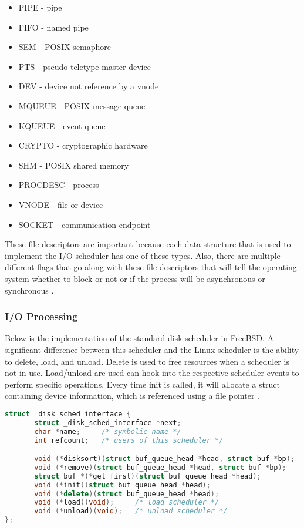 \documentclass[letterpaper,draftclsnofoot,10pt,onecolumn,titlepage]{IEEEtran}\usepackage[margin=0.75in]{geometry}
\begin{document}
        \begin{itemize}
            \item  PIPE - pipe
            \item  FIFO - named pipe
            \item  SEM - POSIX semaphore
            \item  PTS - pseudo-teletype master device
            \item  DEV - device not reference by a vnode
            \item  MQUEUE - POSIX message queue
            \item  KQUEUE - event queue
            \item  CRYPTO - cryptographic hardware
            \item  SHM - POSIX shared memory
            \item  PROCDESC - process
            \item  VNODE - file or device
            \item  SOCKET - communication endpoint
        \end{itemize}

        These file descriptors are important because each data structure that is used to implement the 
        I/O scheduler has one of these types. Also, there are multiple different flags that go along 
        with these file descriptors that will tell the operating system whether to block or not or if 
        the process will be asynchronous or synchronous \cite{FreeBSDBook}.

        \subsubsection{I/O Processing}
        Below is the implementation of the standard disk scheduler in FreeBSD. A significant difference between 
        this scheduler and the Linux scheduler is the ability to delete, load, and unload. Delete is used to free
        resources when a scheduler is not in use. Load/unload are used can hook into the respective scheduler events
        to perform specific operations. Every time init is called, it will allocate a struct containing device 
        information, which is referenced using a file pointer \cite{FreeBSDBook}.

\begin{lstlisting}[language=C++]
struct _disk_sched_interface {
       struct _disk_sched_interface *next;
       char *name;     /* symbolic name */
       int refcount;   /* users of this scheduler */

       void (*disksort)(struct buf_queue_head *head, struct buf *bp);
       void (*remove)(struct buf_queue_head *head, struct buf *bp);
       struct buf *(*get_first)(struct buf_queue_head *head);
       void (*init)(struct buf_queue_head *head);
       void (*delete)(struct buf_queue_head *head);
       void (*load)(void);     /* load scheduler */
       void (*unload)(void);   /* unload scheduler */
};
\end{lstlisting}\cite{freebsd}
\end{document}
